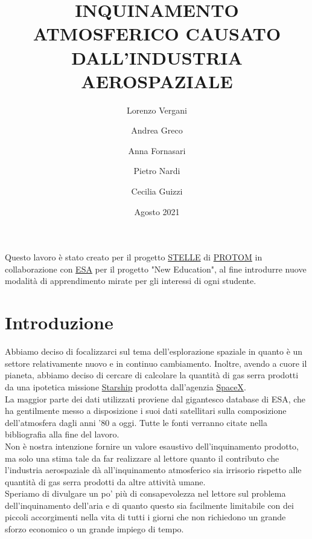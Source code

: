 \documentclass[11pt]{article}
\begin{document}
\title{\huge{\textbf{\textcolor{title_blue}{INQUINAMENTO ATMOSFERICO CAUSATO DALL'INDUSTRIA AEROSPAZIALE}}}}

\author{Lorenzo Vergani \and Andrea Greco \and Anna Fornasari \and Pietro Nardi \and Cecilia Guizzi}
\date{Agosto 2021}
\maketitle

\vspace{11em}
\begin{center}
    Questo lavoro è stato creato per il progetto \href{https://www.protom.com/2021/01/20/new-education-progetti-innovativi-in-collaborazione-con-lesa-agenzia-spaziale-europea/}{STELLE} di \href{https://www.protom.com}{PROTOM} in collaborazione con \href{https://business.esa.int/funding/invitation-to-tender/new-education}{ESA} per il progetto "New Education", al fine introdurre nuove modalità di apprendimento mirate per gli interessi di ogni studente.
\end{center}

\newpage
\tableofcontents
\newpage

\newpage
\section{Introduzione}
Abbiamo deciso di focalizzarci sul tema dell'esplorazione spaziale in quanto è un settore relativamente nuovo e in continuo cambiamento. Inoltre, avendo a cuore il pianeta, abbiamo deciso di cercare di calcolare la quantità di gas serra prodotti da una ipotetica missione \href{https://www.spacex.com/vehicles/starship/}{Starship} prodotta dall'agenzia \href{https://www.spacex.com/}{SpaceX}.\\
La maggior parte dei dati utilizzati proviene dal gigantesco database di ESA, che ha gentilmente messo a disposizione i suoi dati satellitari sulla composizione dell'atmosfera dagli anni '80 a oggi. Tutte le fonti verranno citate nella bibliografia alla fine del lavoro.\\
Non è nostra intenzione fornire un valore esaustivo dell'inquinamento prodotto, ma solo una stima tale da far realizzare al lettore quanto il contributo che l'industria aerospaziale dà all'inquinamento atmosferico sia irrisorio rispetto alle quantità di gas serra prodotti da altre attività umane.\\
Speriamo di divulgare un po' più di consapevolezza nel lettore sul problema dell'inquinamento dell'aria e di quanto questo sia facilmente limitabile con dei piccoli accorgimenti nella vita di tutti i giorni che non richiedono un grande sforzo economico o un grande impiego di tempo.
\newpage
{}
\end{document}
